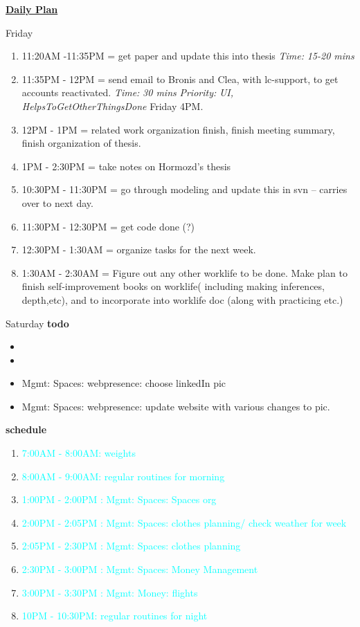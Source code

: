 \documentclass[serif,mathserif,final]{beamer}
\newcommand{\timeEst}[1]{\textit{Time:} \textit{#1}}
\newcommand{\priority}[1]{\textit{Priority:} \textit{#1}}
\newcommand{\regItem}[1]{\item \textcolor{cyan}{#1}}
\newcommand{\deadline}[1]{#1}
\begin{document}
\begin{frame}{}
\begin{columns}[t]
\begin{column}{0.27\linewidth}{\textbf{\underline{Daily Plan}}}
{\begin{block}{\small Friday}
\begin{enumerate}
   \item \tiny 11:20AM -11:35PM = get paper and update this into thesis \timeEst{15-20 mins} 
     
   \item \tiny 11:35PM - 12PM = send email to Bronis and Clea, with lc-support, to get accounts reactivated. \timeEst{30 mins} \priority{UI, HelpsToGetOtherThingsDone} \deadline{Friday 4PM}. 
   \item \tiny 12PM - 1PM  = related work organization finish, finish meeting summary, finish organization of thesis. 
   \item \tiny 1PM - 2:30PM = take notes on Hormozd's thesis
   \item \tiny 10:30PM - 11:30PM = go through modeling and update this in svn -- carries over to next day.
   \item \tiny 11:30PM - 12:30PM =  get code done (?) 
   \item \tiny 12:30PM - 1:30AM = organize tasks for the next week.
     
   \item \tiny 1:30AM - 2:30AM = Figure out any other worklife to be done. Make plan to finish self-improvement books on worklife(
     including making inferences, depth,etc), and to incorporate into worklife doc (along with practicing etc.) 

\end{enumerate} 
\end{block}

\begin{block}{\small Saturday } 
  \textbf{todo} 
  \begin{itemize} 
  \item \tiny 
  \item \tiny

\item \tiny Mgmt: Spaces: webpresence: choose linkedIn pic 
\item \tiny Mgmt: Spaces: webpresence: update website with various changes to pic. 
  \end{itemize} 

  \textbf{schedule} 
  \begin{enumerate} 
    \regItem{7:00AM - 8:00AM: weights}
    \regItem{8:00AM - 9:00AM: regular routines for morning} 

    \regItem{ \tiny  1:00PM - 2:00PM : Mgmt: Spaces: Spaces org} 
    \regItem{\tiny  2:00PM - 2:05PM : Mgmt: Spaces: clothes planning/ check weather for week} 
    \regItem{\tiny  2:05PM - 2:30PM : Mgmt: Spaces: clothes planning} 
    \regItem{ \tiny  2:30PM - 3:00PM :  Mgmt: Spaces: Money Management }
    \regItem{ \tiny  3:00PM - 3:30PM : Mgmt: Money: flights} 
    \regItem{10PM  - 10:30PM: regular routines for night}
  \end{enumerate} 


\end{block}}
\end{column}
\end{columns}
\end{frame}
\end{document}
